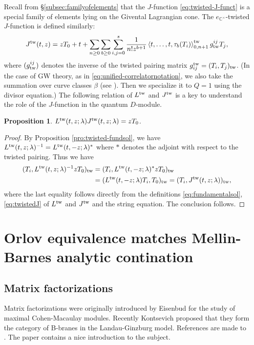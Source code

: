 \documentclass[11pt]{amsart}
\newtheorem{pro}[thm]{Proposition} %
\theoremstyle{definition} %
\theoremstyle{remark} %
\newcommand{\CC}{\mathbb C}
\newcommand{\tw}{{\rm tw}}
\def\corr#1{\left\langle #1 \right\rangle}
\begin{document}
Recall from \S \ref{subsec:familyofelements} 
that the $J$-function \eqref{eq:twisted-J-funct}
is a special family of elements lying on 
the Givental Lagrangian cone. 
The $e_{\CC^\times}$-twisted $J$-function is defined 
similarly: 
\begin{equation} 
\label{eq:twistedJ} 
J^\tw (t,z) = z T_0 + t + \sum_{n\ge 0} \sum_{b\ge 0} 
\sum_{i,j=0}^s  
\frac{1}{n! z^{b+1}} 
\corr{t,\dots, t, \tau_b(T_i)}_{0,n+1}^{\tw} g^{ij}_{\tw} T_j,   
\end{equation} 
where $(g^{ij}_{\tw})$ denotes the inverse of the twisted 
pairing matrix $g_{ij}^\tw =(T_i,T_j)_{\tw}$. 
(In the case of GW theory, as in 
\eqref{eq:unified-correlatornotation}, 
we also take the summation over curve classes $\beta$ 
(see \cite[Eqn (8)]{CCIT:computing}). Then we 
specialize it to $Q=1$ using the divisor equation.) 
The following relation of $L^{\tw}$ and $J^{\tw}$ 
is a key to understand the role of the $J$-function 
in the quantum $D$-module. 
\begin{pro} 
\label{pro:Ltw-Jtw} 
$L^\tw(t,z;\lambda) J^{\tw}(t,z;\lambda) = z T_0$. 
\end{pro} 
\begin{proof} 
By Proposition \ref{pro:twisted-fundsol}, we have 
$L^\tw(t,z;\lambda)^{-1} = L^{\tw}(t,-z;\lambda)^*$ where $*$ 
denotes the adjoint with respect to the twisted 
pairing. Thus we have 
\begin{align*} 
(T_i, L^\tw(t,z;\lambda)^{-1} zT_0)_{\tw} 
&= (T_i, L^\tw(t,-z;\lambda)^* z T_0)_{\tw} \\
& = (L^\tw(t,-z;\lambda) T_i, T_0)_{\tw} = 
(T_i, J^\tw(t,z;\lambda))_{\tw},  
\end{align*} 
where the last equality follows directly from the definitions 
\eqref{eq:fundamentalsol}, \eqref{eq:twistedJ} of $L^\tw$ and $J^\tw$ 
and the string equation. 
The conclusion follows.  
\end{proof} 

\section{Orlov equivalence matches Mellin-Barnes analytic contination}
\label{sec:Orlov=MB}

\subsection{Matrix factorizations} 
\label{subsec:MF} 
Matrix factorizations were originally introduced 
by Eisenbud \cite{Eis} for the study of 
maximal Cohen-Macaulay modules. 
Recently Kontsevich proposed that they form  
the category of B-branes in the Landau-Ginzburg model. 
References are made to 
\cite{Orlov:cat-sing, Orlov:equivalence, Walcher, 
Hori-Walcher:F-term, HHP, Dyckerhoff, PVmf}. 
The paper \cite{Dyckerhoff} contains 
a nice introduction to the subject. 
\end{document}
